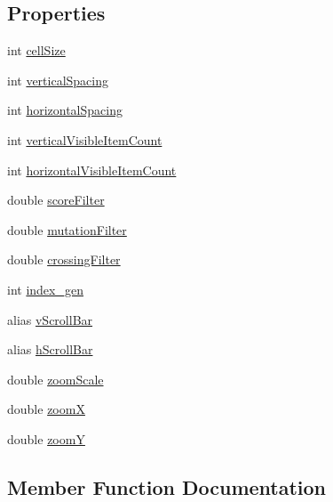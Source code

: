 \subsection*{Properties}
\begin{DoxyCompactItemize}
\item 
int \hyperlink{class_generation_view_ae5ec9b4364f5b05bae157b80448fdc99}{cell\+Size}
\item 
int \hyperlink{class_generation_view_a0a2f5b2a478378c507c7dcbb5b2b7fa2}{vertical\+Spacing}
\item 
int \hyperlink{class_generation_view_a07e1e99c5e0fd85ced01ced765ae051d}{horizontal\+Spacing}
\item 
int \hyperlink{class_generation_view_a2e6dbbc3c82e1a94e9722ec5f63551d9}{vertical\+Visible\+Item\+Count}
\item 
int \hyperlink{class_generation_view_ae21948d40b492b27833b2cff15ec8258}{horizontal\+Visible\+Item\+Count}
\item 
double \hyperlink{class_generation_view_a0f32b1eefc554bc0ed714ac61b81bf72}{score\+Filter}
\item 
double \hyperlink{class_generation_view_ae45158649855a4d52e6b352211a77d6e}{mutation\+Filter}
\item 
double \hyperlink{class_generation_view_a8b94ef0433f5cc2fb0ffd6e0aa6b0c4a}{crossing\+Filter}
\item 
int \hyperlink{class_generation_view_a3bd946690336b8ff4404751dc1e7b41d}{index\+\_\+gen}
\item 
alias \hyperlink{class_generation_view_a5732e342545688643c432cdb9240b243}{v\+Scroll\+Bar}
\item 
alias \hyperlink{class_generation_view_ab409dade06a659dec9865ceea71ce911}{h\+Scroll\+Bar}
\item 
double \hyperlink{class_generation_view_ad57ffa675b53681b9671f7a61286d426}{zoom\+Scale}
\item 
double \hyperlink{class_generation_view_a3d67ca1114e1b862aed9cf857bb7aa10}{zoomX}
\item 
double \hyperlink{class_generation_view_aadd82b9a0aa525d054082aaa4c04c4a9}{zoomY}
\end{DoxyCompactItemize}


\subsection{Member Function Documentation}
\mbox{\label{class_generation_view_abd80b9783934a10769cfdd193494afcf}} 
